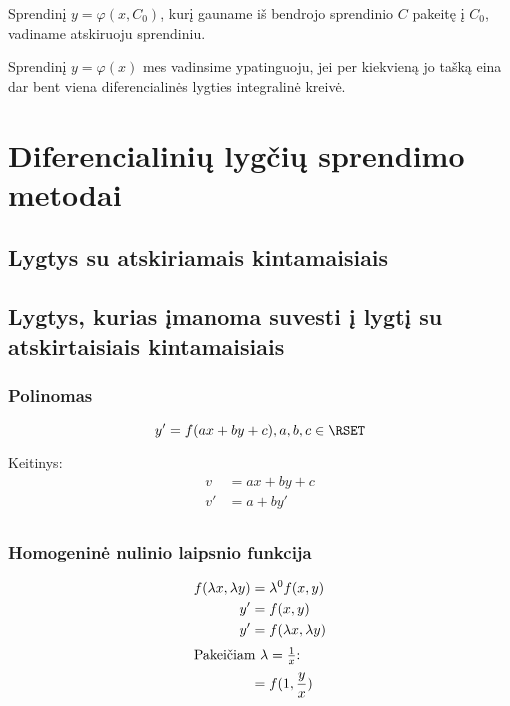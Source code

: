 \begin{defn}
  Sprendinį $y = \varphi(x, C_{0})$, kurį gauname iš bendrojo sprendinio
  $C$ pakeitę į $C_{0}$, vadiname atskiruoju sprendiniu.
\end{defn}

\begin{defn}
  Sprendinį $y = \varphi(x)$ mes vadinsime ypatinguoju, jei per
  kiekvieną jo tašką eina dar bent viena diferencialinės lygties
  integralinė kreivė.
\end{defn}

\section{Diferencialinių lygčių sprendimo metodai}

\subsection{Lygtys su atskiriamais kintamaisiais}

\subsection{Lygtys, kurias įmanoma suvesti į lygtį su atskirtaisiais
kintamaisiais}

\subsubsection{Polinomas}

\begin{equation*}
  y' = f(ax + by + c), a, b, c \in \RSET
\end{equation*}

Keitinys:
\begin{align*}
  v &= ax + by + c \\
  v' &= a + by' \\
\end{align*}

\subsubsection{Homogeninė nulinio laipsnio funkcija}

\begin{align*}
  f(\lambda x, \lambda y) &= \lambda^{0} f(x, y) \\
  y' &= f(x, y) \\
  y' &= f(\lambda x, \lambda y) \\
  \intertext{Pakeičiam $\lambda = \frac{1}{x}$:}
  &= f(1, \frac{y}{x}) \\
\end{align*}

